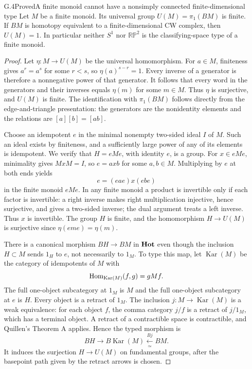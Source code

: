 \begin{nrsourceclaim}{G.4}{Proved}{A finite monoid cannot have a nonsimply connected finite-dimensional type}
Let $M$ be a finite monoid. Its universal group $U(M)=\pi_1(BM)$ is finite. If $BM$ is homotopy equivalent to a finite-dimensional CW complex, then $U(M)=1$. In particular neither $S^1$ nor $\mathbb{RP}^2$ is the classifying-space type of a finite monoid.
\end{nrsourceclaim}
\begin{proof}
Let $\eta:M\to U(M)$ be the universal homomorphism. For $a\in M$, finiteness gives $a^r=a^s$ for some $r<s$, so $\eta(a)^{s-r}=1$. Every inverse of a generator is therefore a nonnegative power of that generator. It follows that every word in the generators and their inverses equals $\eta(m)$ for some $m\in M$. Thus $\eta$ is surjective, and $U(M)$ is finite. The identification with $\pi_1(BM)$ follows directly from the edge-and-triangle presentation: the generators are the nonidentity elements and the relations are $[a][b]=[ab]$.

Choose an idempotent $e$ in the minimal nonempty two-sided ideal $I$ of $M$. Such an ideal exists by finiteness, and a sufficiently large power of any of its elements is idempotent. We verify that $H=eMe$, with identity $e$, is a group. For $x\in eMe$, minimality gives $MxM=I$, so $e=axb$ for some $a,b\in M$. Multiplying by $e$ at both ends yields
\[
                    e=(eae)x(ebe)
\]
in the finite monoid $eMe$. In any finite monoid a product is invertible only if each factor is invertible: a right inverse makes right multiplication injective, hence surjective, and gives a two-sided inverse; the dual argument treats a left inverse. Thus $x$ is invertible. The group $H$ is finite, and the homomorphism $H\to U(M)$ is surjective since $\eta(eme)=\eta(m)$.

There is a canonical morphism $BH\to BM$ in $\mathbf{Hot}$ even though the inclusion $H\subset M$ sends $1_H$ to $e$, not necessarily to $1_M$. To type this map, let $\operatorname{Kar}(M)$ be the category of idempotents of $M$ with
\[
       \operatorname{Hom}_{\operatorname{Kar}(M)}(f,g)=gMf.
\]
The full one-object subcategory at $1_M$ is $M$ and the full one-object subcategory at $e$ is $H$. Every object is a retract of $1_M$. The inclusion $j:M\to\operatorname{Kar}(M)$ is a weak equivalence: for each object $f$, the comma category $j/f$ is a retract of $j/1_M$, which has a terminal object. A retract of a contractible space is contractible, and Quillen's Theorem A applies. Hence the typed morphism is
\[
          BH\longrightarrow B\operatorname{Kar}(M)
                     \xleftarrow[\simeq]{Bj} BM.
\]
It induces the surjection $H\to U(M)$ on fundamental groups, after the basepoint path given by the retract arrows is chosen.


\end{proof}
